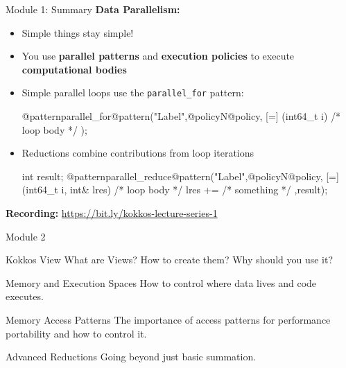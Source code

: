 \begin{frame}[fragile]{Module 1: Summary}
	\textbf{Data Parallelism:}
	\begin{itemize}
		\item Simple things stay simple!
		\item You use \textbf{parallel patterns} and \textbf{execution policies} to execute \textbf{computational bodies}
		\item Simple parallel loops use the \texttt{parallel\_for} pattern:
\begin{code}[linebackgroundcolor={\btLstHL<1->{3}{bodyColor}},frame=single]
  @patternparallel_for@pattern("Label",@policyN@policy, [=] (int64_t i) {
   /* loop body */
  });
\end{code}
\item Reductions combine contributions from loop iterations
\begin{code}[linebackgroundcolor={\btLstHL<1->{3}{bodyColor}},frame=single]
int result;
@patternparallel_reduce@pattern("Label",@policyN@policy, [=] (int64_t i, int& lres) {
   /* loop body */
    lres += /* something */
  },result);
\end{code}

\end{itemize}

	\textbf{Recording:} \url{https://bit.ly/kokkos-lecture-series-1}

\end{frame}

\begin{frame}{Module 2}
  \begin{block}{Kokkos View}
    What are Views? How to create them? Why should you use it?
  \end{block}


  \begin{block}{Memory and Execution Spaces}
    How to control where data lives and code executes.
  \end{block}

  \begin{block}{Memory Access Patterns}
    The importance of access patterns for performance portability and how to control it.
  \end{block}

  \begin{block}{Advanced Reductions}
    Going beyond just basic summation.
  \end{block}
\end{frame}  



